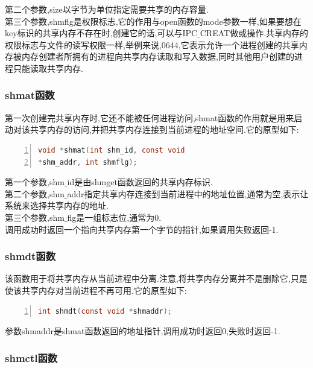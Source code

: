 \documentclass[a4paper,12pt,notitlepage]{article}
\begin{document}
	第二个参数,size以字节为单位指定需要共享的内存容量. \\

	第三个参数,shmflg是权限标志,它的作用与open函数的mode参数一样,如果要想在key标识的共享内存不存在时,创建它的话,可以与IPC$\_$CREAT做或操作.共享内存的权限标志与文件的读写权限一样,举例来说,0644,它表示允许一个进程创建的共享内存被内存创建者所拥有的进程向共享内存读取和写入数据,同时其他用户创建的进程只能读取共享内存.\\

\subsubsection{shmat函数}

	第一次创建完共享内存时,它还不能被任何进程访问,shmat函数的作用就是用来启动对该共享内存的访问,并把共享内存连接到当前进程的地址空间.它的原型如下:
	
\begin{lstlisting}[frame=shadowbox,numbers=left,language=C]
void *shmat(int shm_id, const void 
*shm_addr, int shmflg);
\end{lstlisting}

	第一个参数,shm$\_$id是由shmget函数返回的共享内存标识.\\
	
	第二个参数,shm$\_$addr指定共享内存连接到当前进程中的地址位置,通常为空,表示让系统来选择共享内存的地址.\\
	
	第三个参数,shm$\_$flg是一组标志位,通常为0.\\

	调用成功时返回一个指向共享内存第一个字节的指针,如果调用失败返回-1. \\
	
\subsubsection{shmdt函数}

	该函数用于将共享内存从当前进程中分离.注意,将共享内存分离并不是删除它,只是使该共享内存对当前进程不再可用.它的原型如下:
	
\begin{lstlisting}[frame=shadowbox,numbers=left,language=C]
int shmdt(const void *shmaddr);
\end{lstlisting}

	参数shmaddr是shmat函数返回的地址指针,调用成功时返回0,失败时返回-1. \\
	
\subsubsection{shmctl函数}
\end{document}

